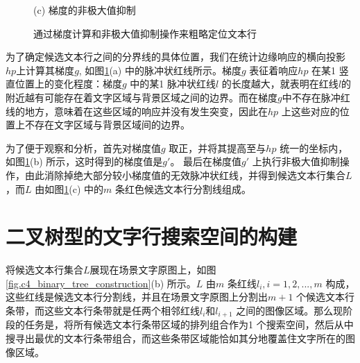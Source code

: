 \begin{figure}[!h]
\begin{minipage}[t]{0.32\linewidth}
        \centerline{\small (c) 梯度的非极大值抑制}
        \end{minipage}
        \caption{通过梯度计算和非极大值抑制操作来粗略定位文本行}
        \label{fig.c4_candidate_line_construction}
        \end{figure}

        为了确定候选文本行之间的分界线的具体位置，我们在统计边缘响应的横向投影$hp$上计算其梯度$g$, 如图\ref{fig.c4_candidate_line_construction}(a) 中的脉冲状红线所示。梯度$g$ 表征着响应$hp$ 在某1 竖直位置上的变化程度：梯度$g$ 中的某1 脉冲状红线$l$ 的长度越大，就表明在红线$l$的附近越有可能存在着文字区域与背景区域之间的边界。而在梯度$g$中不存在脉冲红线的地方，意味着在这些区域的响应并没有发生突变，因此在$hp$ 上这些对应的位置上不存在文字区域与背景区域间的边界。

        为了便于观察和分析，首先对梯度值$g$ 取正，并将其提高至与$hp$ 统一的坐标内，如图\ref{fig.c4_candidate_line_construction}(b) 所示，这时得到的梯度值是$g$$'$。 最后在梯度值$g$$'$ 上执行非极大值抑制操作，由此消除掉绝大部分较小梯度值的无效脉冲状红线，并得到候选文本行集合$L$，而$L$ 由如图\ref{fig.c4_candidate_line_construction}(c) 中的$m$ 条红色候选文本行分割线组成。

    \section{二叉树型的文字行搜索空间的构建}

    将候选文本行集合$L$展现在场景文字原图上，如图\ref{fig.c4_binary_tree_construction}(b) 所示。$L$ 由$m$ 条红线$l_i, i=1,2,...,m$ 构成，这些红线是候选文本行分割线，并且在场景文字原图上分割出$m+1$ 个候选文本行条带，而这些文本行条带就是任两个相邻红线$l_i$和$l_{i+1}$ 之间的图像区域。那么现阶段的任务是，将所有候选文本行条带区域的排列组合作为1 个搜索空间，然后从中搜寻出最优的文本行条带组合，而这些条带区域能恰如其分地覆盖住文字所在的图像区域。

